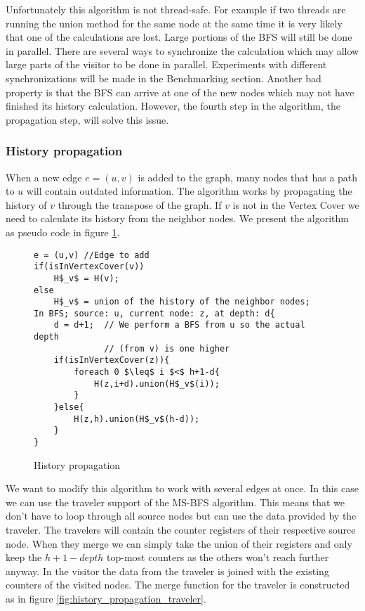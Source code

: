 Unfortunately this algorithm is not thread-safe. For example if two threads are running the union method for the same node at the same time it is very likely that one of the calculations are lost. Large portions of the BFS will still be done in parallel. There are several ways to synchronize the calculation which may allow large parts of the visitor to be done in parallel. Experiments with different synchronizations will be made in the Benchmarking section. Another bad property is that the BFS can arrive at one of the new nodes which may not have finished its history calculation. However, the fourth step in the algorithm, the propagation step, will solve this issue. 

\subsubsection{History propagation}

When a new edge $e = (u,v)$ is added to the graph, many nodes that has a path to $u$ will contain outdated information. The algorithm works by propagating the history of $v$ through the transpose of the graph. If $v$ is not in the Vertex Cover we need to calculate its history from the neighbor nodes. We present the algorithm as pseudo code in figure \ref{fig:history_propagation_algorithm}.

\begin{figure}[h]
    \begin{lstlisting}[mathescape]
e = (u,v) //Edge to add
if(isInVertexCover(v))
    H$_v$ = H(v);
else
    H$_v$ = union of the history of the neighbor nodes;
In BFS; source: u, current node: z, at depth: d{
    d = d+1;  // We perform a BFS from u so the actual depth 
              // (from v) is one higher
    if(isInVertexCover(z)){
        foreach 0 $\leq$ i $<$ h+1-d{
            H(z,i+d).union(H$_v$(i));
        }
    }else{
        H(z,h).union(H$_v$(h-d));
    }
}
    \end{lstlisting}
    \caption{History propagation}
    \label{fig:history_propagation_algorithm}
\end{figure}

We want to modify this algorithm to work with several edges at once. In this case we can use the traveler support of the MS-BFS algorithm. This means that we don't have to loop through all source nodes but can use the data provided by the traveler. The travelers will contain the counter registers of their respective source node. When they merge we can simply take the union of their registers and only keep the $h+1-depth$ top-most counters as the others won't reach further anyway. In the visitor the data from the traveler is joined with the existing counters of the visited nodes. The merge function for the traveler is constructed as in figure \ref{fig:history_propagation_traveler}.

